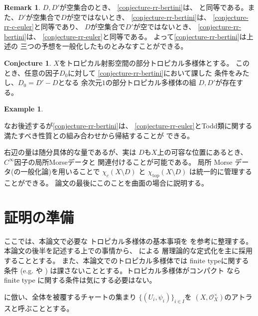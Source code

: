 \documentclass[a4paper,dvipdfmx,reqno,12pt]{amsart}
\theoremstyle{definition}
\newtheorem{example}[theorem]{Example}
\newtheorem{conjecture}[theorem]{Conjecture}
\newtheorem{remark}[theorem]{Remark}
\numberwithin{equation}{section}
\begin{document}
\begin{remark}
$D,D'$が空集合のとき、
\cref{conjecture-rr-bertini}は、
\cite[Conjecture 6.13]{demedrano2023chern}
と同等である。また、$D'$が空集合で$D$が空ではないとき、
\cref{conjecture-rr-bertini}は、
\cref{conjecture-rr-c-euler}と同等であり、
$D$が空集合で$D'$が空ではないとき、
\cref{conjecture-rr-bertini}は、
\cref{conjecture-rr-euler}と同等である。
よって\cref{conjecture-rr-bertini}は上述の
三つの予想を一般化したものとみなすことができる。
\end{remark}

\begin{conjecture}
$X$をトロピカル射影空間の部分トロピカル多様体とする。
このとき、任意の因子$D_0$に対して
\cref{conjecture-rr-bertini}において課した
条件をみたし、$D_0=D'-D$となる
余次元$1$の部分トロピカル多様体の組
$D,D'$が存在する。
\end{conjecture}

\begin{example}
     
\end{example}

なお後述するが\cref{conjecture-rr-bertini}は、
\cref{conjecture-rr-euler}とTodd類に関する
満たすべき性質との組み合わせから帰結することが
できる。

右辺の量は随分具体的な量であるが、実は
$D$も$X$上の可容な位置にあるとき、
$C^{\infty}$因子の局所Morseデータと
関連付けることが可能である。
局所 Morse データ(の一般化論)を用いることで
$\chi_c(X\setminus D)$ と
$\chi_{\mathrm{top}}(X\setminus D)$
は統一的に管理することができる。
論文の最後にこのことを曲面の場合に説明する。

\section{証明の準備}

ここでは、本論文で必要な
トロピカル多様体の基本事項を
\cite{gross2019sheaftheoretic,demedrano2023chern}
を参考に整理する。
本論文の後半を記述する上での事情から、
\cite{gross2019sheaftheoretic}による
層理論的な定式化を主に採用することとする。
また、本論文でのトロピカル多様体では
finite typeに関する条件
(e.g. \cite[Definition 7.1.14]{mikhalkin2018tropical} や
\cite[Definition 2.3 (4)]{demedrano2023chern})
は課さないこととする。トロピカル多様体がコンパクト
なら finite type に関する条件は気にする必要はない。

\cite{demedrano2023chern}に倣い、全体を被覆するチャートの集まり
$\{(U_i,\psi_i)\}_{i\in I}$を
$(X,\mathcal{O}_X^{\times})$のアトラスと呼ぶこととする。
\end{document}
